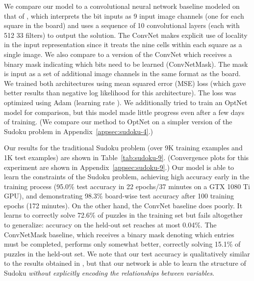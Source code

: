 \documentclass{article}
\begin{document}
	We compare our model to a convolutional neural network baseline modeled on that of \citet{park2016can}, which interprets the bit inputs as 9 input image channels (one for each square in the board) and uses a sequence of 10 convolutional layers (each with 512 33 filters) to output the solution. The ConvNet makes explicit use of locality in the input representation since it treats the nine cells within each square as a single image. We also compare to a version of the ConvNet which receives a binary mask indicating which bits need to be learned (ConvNetMask). The mask is input as a set of additional image channels in the same format as the board. We trained both architectures using mean squared error (MSE) loss (which gave better results than negative log likelihood for this architecture). 
	The loss was optimized using Adam (learning rate ).  
	We additionally tried to train an OptNet \cite{amos2017optnet} model for comparison, but this model made little progress even after a few days of training.
	(We compare our method to OptNet on a simpler  version of the Sudoku problem in Appendix~\ref{appsec:sudoku-4}.)
	
	Our results for the traditional  Sudoku problem (over 9K training examples and 1K test examples) are shown in Table~\ref{tab:sudoku-9}. (Convergence plots for this experiment are shown in Appendix~\ref{appsec:sudoku-9}.)
	Our model is able to 
learn the constraints of the Sudoku problem, achieving high accuracy early in the training process (95.0\% test accuracy in 22 epochs/37 minutes on a GTX 1080 Ti GPU), and demonstrating 98.3\% board-wise test accuracy after 100 training epochs (172 minutes).
On the other hand, the ConvNet baseline does poorly. It learns to correctly solve 72.6\% of puzzles in the training set but fails altogether to generalize: accuracy on the held-out set reaches at most 0.04\%. The ConvNetMask baseline, which receives a binary mask denoting which entries must be completed, performs only somewhat better, correctly solving 15.1\% of puzzles in the held-out set. 
	We note that our test accuracy is qualitatively similar to the results obtained in \citet{palm2017recurrent}, but that our network is able to learn the structure of Sudoku \emph{without explicitly encoding the relationships between variables}.
	
\end{document}
